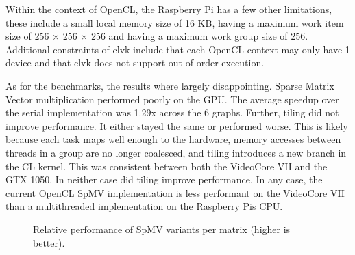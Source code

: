 \documentclass[conference]{IEEEtran}
\begin{document}
 Within the context of OpenCL, the Raspberry Pi has a few other limitations, these include a small local memory size of 
 16 KB, having a maximum work item size of 256 × 256 × 256 and having a maximum work group size of 256. Additional 
 constraints of clvk include that each OpenCL context may only have 1 device and that clvk does not support out of order 
 execution.

 As for the benchmarks, the results where largely disappointing. Sparse Matrix Vector multiplication performed poorly 
 on the GPU. The average speedup over the serial implementation was 1.29x across the 6 graphs. Further, tiling did not improve 
 performance. It either stayed the same or performed worse. This is likely because each task maps well enough to the hardware, memory 
 accesses between threads in a group are no longer coalesced, and tiling introduces a new branch in the CL kernel. This was consistent 
 between both the VideoCore VII and the GTX 1050. In neither case did tiling improve performance. In any case, the current OpenCL SpMV 
 implementation is less performant on the VideoCore VII than a multithreaded implementation on the Raspberry Pis CPU.


\begin{figure}[t]
  \centering
  \caption{Relative performance of SpMV variants per matrix (higher is better).}
  \label{fig:spmv_speedup_bars}
\end{figure}
\end{document}
